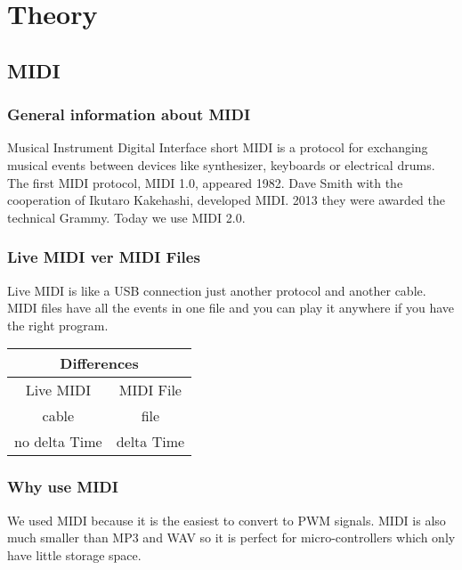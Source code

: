 \chapter{Theory}

\section{MIDI}

\subsection{General information about MIDI}

Musical Instrument Digital Interface short MIDI is a protocol for exchanging musical events between devices like synthesizer, keyboards or electrical drums. The first MIDI protocol, MIDI 1.0, appeared 1982. Dave Smith with the cooperation of Ikutaro Kakehashi, developed MIDI. 2013 they were awarded the technical Grammy. Today we use MIDI 2.0.

\subsection{Live MIDI ver MIDI Files}

Live MIDI is like a USB connection just another protocol and another cable. MIDI files have all the events in one file and you can play it anywhere if you have the right program.

\begin{center}
\begin{tabular}{@{}cc@{}}
\toprule
\multicolumn{2}{c}{Differences}             \\\midrule
Live MIDI            & MIDI File            \\
cable                & file                 \\
no delta Time        & delta Time           \\\bottomrule
\end{tabular}
\end{center}
\phantom{Hello}

\subsection{Why use MIDI}

We used MIDI because it is the easiest to convert to PWM signals. MIDI is also much smaller than MP3 and WAV so it is perfect for micro-controllers which only have little storage space.  

